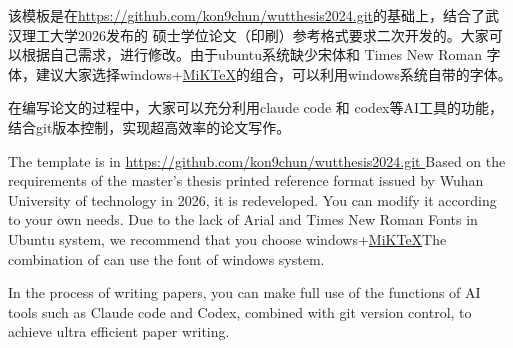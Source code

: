 \begin{WUTChineseabstract}
该模板是在\url{https://github.com/kon9chun/wutthesis2024.git}的基础上，结合了武汉理工大学2026发布的 硕士学位论文（印刷）参考格式要求二次开发的。大家可以根据自己需求，进行修改。由于ubuntu系统缺少宋体和 Times New Roman 字体，建议大家选择windows+\href{https://miktex.org/}{MiKTeX}的组合，可以利用windows系统自带的字体。

在编写论文的过程中，大家可以充分利用claude code 和 codex等AI工具的功能，结合git版本控制，实现超高效率的论文写作。
\end{WUTChineseabstract}

\begin{WUTEnglishabstract}
The template is in \url{ https://github.com/kon9chun/wutthesis2024.git } Based on the requirements of the master's thesis printed reference format issued by Wuhan University of technology in 2026, it is redeveloped.
You can modify it according to your own needs.
Due to the lack of Arial and Times New Roman Fonts in Ubuntu system, we recommend that you choose windows+\href{ https://miktex.org/}{MiKTeX}The combination of  can use the font of windows system.

In the process of writing papers, you can make full use of the functions of AI tools such as Claude code and Codex, combined with git version control, to achieve ultra efficient paper writing.
\end{WUTEnglishabstract}
